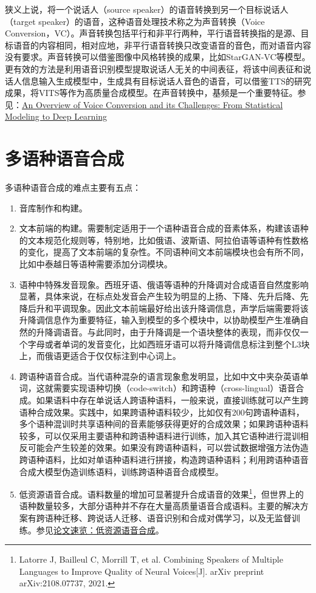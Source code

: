 \documentclass[cn,10pt,math=newtx,citestyle=gb7714-2015,bibstyle=gb7714-2015]{elegantbook}
\begin{document}
狭义上说，将一个说话人（source speaker）的语音转换到另一个目标说话人（target speaker）的语音，这种语音处理技术称之为声音转换（Voice Conversion，VC）。声音转换包括平行和非平行两种，平行语音转换指的是源、目标语音的内容相同，相对应地，非平行语音转换只改变语音的音色，而对语音内容没有要求。声音转换可以借鉴图像中风格转换的成果，比如StarGAN-VC等模型。更有效的方法是利用语音识别模型提取说话人无关的中间表征，将该中间表征和说话人信息输入生成模型中，生成具有目标说话人音色的语音，可以借鉴TTS的研究成果，将VITS等作为高质量合成模型。在声音转换中，基频是一个重要特征。参见：\href{https://arxiv.org/abs/2008.03648}{An Overview of Voice Conversion and its Challenges: From Statistical Modeling to Deep Learning}

\section{多语种语音合成}

多语种语音合成的难点主要有五点：

\begin{enumerate}
  \item 音库制作和构建。
  \item 文本前端的构建。需要制定适用于一个语种语音合成的音素体系，构建该语种的文本规范化规则等，特别地，比如俄语、波斯语、阿拉伯语等语种有性数格的变化，提高了文本前端的复杂性。不同语种间文本前端模块也会有所不同，比如中泰越日等语种需要添加分词模块。
  \item 语种中特殊发音现象。西班牙语、俄语等语种的升降调对合成语音自然度影响显著，具体来说，在标点处发音会产生较为明显的上扬、下降、先升后降、先降后升和平调现象。因此文本前端最好给出该升降调信息，声学后端需要将该升降调信息作为重要特征，输入到模型的多个模块中，以协助模型产生准确自然的升降调语音。与此同时，由于升降调是一个语块整体的表现，而非仅仅一个字母或者单词的发音变化，比如西班牙语可以将升降调信息标注到整个L3块上，而俄语更适合于仅仅标注到中心词上。
  \item 跨语种语音合成。当代语种混杂的语言现象愈发明显，比如中文中夹杂英语单词，这就需要实现语种切换（code-switch）和跨语种（cross-lingual）语音合成。如果语料中存在单说话人跨语种语料，一般来说，直接训练就可以产生跨语种合成效果。实践中，如果跨语种语料较少，比如仅有200句跨语种语料，多个语种混训时共享语种间的音素能够获得更好的合成效果；如果跨语种语料较多，可以仅采用主要语种和跨语种语料进行训练，加入其它语种进行混训相反可能会产生较差的效果。如果没有跨语种语料，可以尝试数据增强方法伪造跨语种语料，比如对单语种语料进行拼接，构造跨语种语料；利用跨语种语音合成大模型伪造训练语料，训练跨语种语音合成模型。
  \item 低资源语音合成。语料数量的增加可显著提升合成语音的效果\footnote{Latorre J, Bailleul C, Morrill T, et al. Combining Speakers of Multiple Languages to Improve Quality of Neural Voices[J]. arXiv preprint arXiv:2108.07737, 2021.}，但世界上的语种数量较多，大部分语种并不存在大量高质量语音合成语料。主要的解决方案有跨语种迁移、跨说话人迁移、语音识别和合成对偶学习，以及无监督训练。参见\href{https://zhuanlan.zhihu.com/p/413274637}{论文速览：低资源语音合成}。
\end{enumerate}
\end{document}
